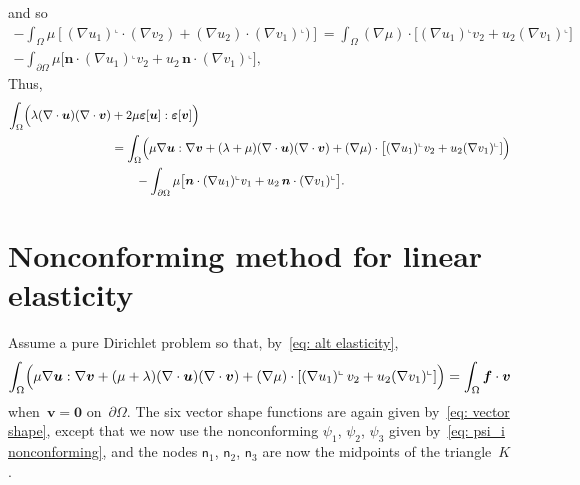 \documentclass[a4paper,12pt]{article}
\newcommand{\bs}[1]{\boldsymbol{#1}}
\newcommand{\rot}{^\llcorner}
\begin{document}
and so
\begin{multline*}
-\int_\Omega\mu[(\nabla u_1)\rot\cdot(\nabla v_2)
        +(\nabla u_2)\cdot(\nabla v_1)\rot)]
    =\int_\Omega(\nabla\mu)\cdot\bigl[(\nabla u_1)\rot v_2
    +u_2(\nabla v_1)\rot]\\
    -\int_{\partial\Omega}\mu\bigl[
    \bs{n}\cdot(\nabla u_1)\rot v_2+u_2\,\bs{n}\cdot(\nabla v_1)\rot\bigr],
\end{multline*}
Thus,
\begin{align*}
\int_\Omega\Bigl(\lambda(\nabla\cdot\bs{u})(\nabla\cdot\bs{v})
&+2\mu\bs{\varepsilon}[\bs{u}]:\bs{\varepsilon}[\bs{v}]\Bigr)\\
    &=\int_\Omega\Bigl(\mu\nabla\bs{u}:\nabla\bs{v}
    +(\lambda+\mu)(\nabla\cdot\bs{u})(\nabla\cdot\bs{v})
    +(\nabla\mu)\cdot\bigl[(\nabla u_1)\rot v_2+u_2(\nabla v_1)\rot]\Bigr)\\
    &\qquad{}-\int_{\partial\Omega}\mu\bigl[
    \bs{n}\cdot(\nabla u_1)\rot v_1+u_2\,\bs{n}\cdot(\nabla v_1)\rot\bigr].
\end{align*}

\section{Nonconforming method for linear elasticity}
Assume a pure Dirichlet problem so that, by~\eqref{eq: alt elasticity},
\[
\int_\Omega\Bigl(\mu\nabla\bs{u}:\nabla\bs{v}+(\mu+\lambda)
        (\nabla\cdot\bs{u})(\nabla\cdot\bs{v})
    +(\nabla\mu)\cdot[(\nabla u_1)\rot\,v_2
    +u_2(\nabla v_1)\rot]\Bigr)=\int_\Omega\bs{f}\cdot\bs{v}
\]
when~$\bs{v}=\bs{0}$ on~$\partial\Omega$.  The six vector shape functions are 
again given by~\eqref{eq: vector shape}, except that we now use the 
nonconforming $\psi_1$, $\psi_2$, $\psi_3$ given 
by~\eqref{eq: psi_i nonconforming}, and the nodes $\mathsf{n}_1$, 
$\mathsf{n}_2$, $\mathsf{n}_3$ are now the midpoints of the triangle~$K$.
\end{document}
